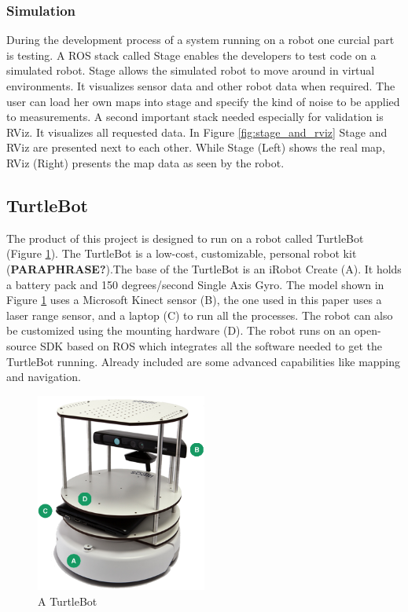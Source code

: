 \documentclass{ba-kecs}
\begin{document}
\subsubsection{Simulation}
During the development process of a system running on a robot one curcial part is testing. A ROS stack called Stage enables the developers to test code on a simulated robot. Stage allows the simulated robot to move around in virtual environments. It visualizes sensor data and other robot data when required. The user can load her own maps into stage and specify the kind of noise to be applied to measurements. A second important stack needed especially for validation is RViz. It visualizes all requested data. In Figure \ref{fig:stage_and_rviz} Stage and RViz are presented next to each other. While Stage (Left) shows the real map, RViz (Right) presents the map data as seen by the robot.

\subsection{TurtleBot}
 \label{subsec:turtle}

The product of this project is designed to run on a robot called TurtleBot (Figure \ref{fig:turtlebot}). The TurtleBot is a low-cost, customizable, personal robot kit (\textbf{PARAPHRASE?}).The base of the TurtleBot is an iRobot Create (A). It holds a battery pack and 150 degrees/second Single Axis Gyro. The model shown in Figure \ref{fig:turtlebot} uses a Microsoft Kinect sensor (B), the one used in this paper uses a laser range sensor, and a laptop (C) to run all the processes. The robot can also be customized using the mounting hardware (D). The robot runs on an open-source SDK based on ROS which integrates all the software needed to get the TurtleBot running. Already included are some advanced capabilities like mapping and navigation.
\begin{figure}[h]
	\centering
		\includegraphics[width=0.50\textwidth]{figures/turtlebot.png}
	\caption{A TurtleBot}
	\label{fig:turtlebot}
\end{figure}
\end{document}
